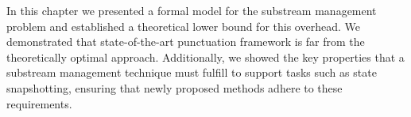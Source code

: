 \label {fs-acker-conclusion}

In this chapter we presented a formal model for the substream management problem and established a theoretical lower bound for this overhead. We demonstrated that state-of-the-art punctuation framework is far from the theoretically optimal approach. Additionally, we showed the key properties that a substream management technique must fulfill to support tasks such as state snapshotting, ensuring that newly proposed methods adhere to these requirements.